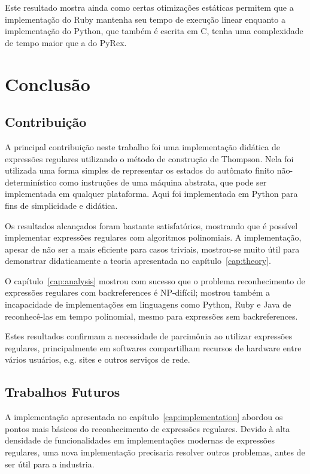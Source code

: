 \documentclass[a4paper,12pt,oneside,onecolumn]{uerj}
\begin{document}
Este resultado mostra ainda como certas otimizações estáticas permitem que a implementação do Ruby mantenha seu tempo de execução linear enquanto a implementação do Python, que também é escrita em C, tenha uma complexidade de tempo maior que a do PyRex.

\chapter{Conclusão}

\section{Contribuição}

A principal contribuição neste trabalho foi uma implementação didática de expressões regulares utilizando o método de construção de Thompson. Nela foi utilizada uma forma simples de representar os estados do autômato finito não-determinístico como instruções de uma máquina abstrata, que pode ser implementada em qualquer plataforma. Aqui foi implementada em Python para fins de simplicidade e didática.

Os resultados alcançados foram bastante satisfatórios, mostrando que é possível implementar expressões regulares com algoritmos polinomiais. A implementação, apesar de não ser a mais eficiente para casos triviais, mostrou-se muito útil para demonstrar didaticamente a teoria apresentada no capítulo~\ref{cap:theory}.

O capítulo~\ref{cap:analysis} mostrou com sucesso que o problema reconhecimento de expressões regulares com backreferences é NP-difícil; mostrou também a incapacidade de implementações em linguagens como Python, Ruby e Java de reconhecê-las em tempo polinomial, mesmo para expressões sem backreferences.

Estes resultados confirmam a necessidade de parcimônia ao utilizar expressões regulares, principalmente em softwares compartilham recursos de hardware entre vários usuários, e.g. sites e outros serviços de rede.

\section{Trabalhos Futuros}

A implementação apresentada no capítulo~\ref{cap:implementation} abordou os pontos mais básicos do reconhecimento de expressões regulares. Devido à alta densidade de funcionalidades em implementações modernas de expressões regulares, uma nova implementação precisaria resolver outros problemas, antes de ser útil para a industria.
\end{document}
